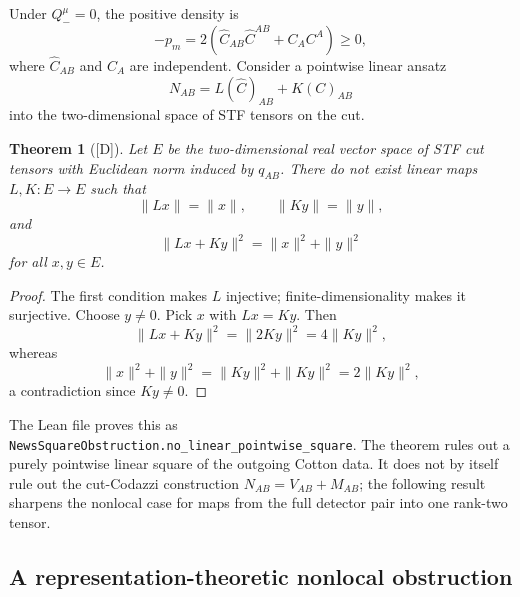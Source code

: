 \documentclass[11pt,a4paper]{article}
\newtheorem{theorem}{Theorem}[section]
\newcommand{\statusD}{\textsf{[D]}}
\begin{document}
Under \(Q_-^\mu=0\), the positive density is
\begin{equation}
  -p_m=2(\hat C_{AB}\hat C^{AB}+C_A C^A)\ge0,
\end{equation}
where \(\hat C_{AB}\) and \(C_A\) are independent.  Consider a pointwise linear ansatz
\begin{equation}
  N_{AB}=L(\hat C)_{AB}+K(C)_{AB}
\end{equation}
into the two-dimensional space of STF tensors on the cut.

\begin{theorem}[\statusD]
Let \(E\) be the two-dimensional real vector space of STF cut tensors with Euclidean norm induced by \(q_{AB}\).  There do not exist linear maps \(L,K:E\to E\) such that
\begin{equation}
  \|Lx\|=\|x\|,\qquad \|Ky\|=\|y\|,
\end{equation}
and
\begin{equation}
  \|Lx+Ky\|^2=\|x\|^2+\|y\|^2
\end{equation}
for all \(x,y\in E\).
\end{theorem}
\begin{proof}
The first condition makes \(L\) injective; finite-dimensionality makes it surjective.  Choose \(y\neq0\).  Pick \(x\) with \(Lx=Ky\).  Then
\begin{equation}
  \|Lx+Ky\|^2=\|2Ky\|^2=4\|Ky\|^2,
\end{equation}
whereas
\begin{equation}
  \|x\|^2+\|y\|^2=\|Ky\|^2+\|Ky\|^2=2\|Ky\|^2,
\end{equation}
a contradiction since \(Ky\neq0\).
\end{proof}

The Lean file proves this as \texttt{NewsSquareObstruction.no\_linear\_pointwise\_square}.  The theorem rules out a purely pointwise linear square of the outgoing Cotton data.  It does not by itself rule out the cut-Codazzi construction \(N_{AB}=V_{AB}+M_{AB}\); the following result sharpens the nonlocal case for maps from the full detector pair into one rank-two tensor.

\subsection{A representation-theoretic nonlocal obstruction}
\end{document}
